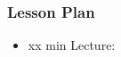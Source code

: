 \begin{frame}
    \frametitle{Lesson Plan}
    \begin{itemize}
        \item xx min Lecture: 
    \end{itemize}
\end{frame}




